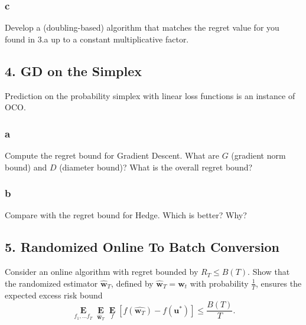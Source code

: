 \documentclass[10pt, a4paper, twoside]{amsart}
\theoremstyle{plain}
\newcommand{\Ev}{\operatorname*{\ensuremath{\mathbf{E}}}} %
\newcommand{\bw}{\ensuremath{\mathbf{w}}} %
\newcommand{\bu}{\ensuremath{\mathbf{u}}} %
\begin{document}
\subsubsection*{c}
Develop a (doubling-based) algorithm that matches the regret value for you found in 3.a up to a constant multiplicative factor.

\subsection*{4. GD on the Simplex}
Prediction on the probability simplex with linear loss functions is an instance of OCO.
\subsubsection*{a}
Compute the regret bound for Gradient Descent. What are $G$ (gradient norm bound) and $D$ (diameter bound)? What is the overall regret bound?
\subsubsection*{b}
Compare with the regret bound for Hedge. Which is better? Why?

\subsection*{5. Randomized Online To Batch Conversion}
Consider an online algorithm with regret bounded by $R_T \leq B(T)$. Show that the randomized estimator $\hat{\bw}_T$, defined by $\hat{\bw}_T = \bw_t$ with probability $\frac{1}{T}$, ensures the expected excess risk bound
\begin{equation*}
  \Ev_{f_1, \ldots f_T} \Ev_{\hat{\bw}_T} \Ev_f \left[ f(\hat{\bw_T}) - f(\bu^*) \right] \leq \frac{B(T)}{T}.
\end{equation*}
\end{document}
